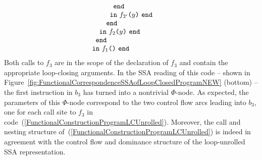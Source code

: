 \begin{equation}
\begin{array}{l}
\begin{array}{l}
\begin{array}[t]{l}
\begin{array}{l}
\begin{array}[t]{l}
\begin{array}[t]{l}
\begin{array}[t]{l}
                              \texttt{end}
                            \end{array}\\
                      \texttt{in}\ {f_{2'}}\texttt{(}{y}\texttt{)}\ \texttt{end}
                  \end{array}\\
                  \texttt{end}
               \end{array}
            \end{array}\\
       \texttt{in}\ {f_2}\texttt{(}{y}\texttt{)}\ \texttt{end}
     \end{array}\\
     \texttt{end}
  \end{array}\\
  \texttt{in}\ {f_1}\texttt{(}{}\texttt{)}\ \texttt{end}
\end{array}
\end{equation}
Both calls to $f_3$ are in the scope of the declaration of $f_3$ and
contain the appropriate loop-closing arguments. In the SSA reading of
this code -- shown in
Figure~\ref{fig:FunctionalCorrespondenceSSAofLoopClosedProgramNEW}
(bottom) -- the first instruction in $b_3$ has turned into a
nontrivial $\Phi$-node. As expected, the parameters of this
$\Phi$-node correspond to the two control flow arcs leading into
$b_3$, one for each call site to $f_3$ in
code~(\ref{FunctionalConstructionProgramLCUnrolled}). Moreover, the
call and nesting structure
of~(\ref{FunctionalConstructionProgramLCUnrolled}) is indeed in
agreement with the control flow and dominance structure of the
loop-unrolled SSA representation.


